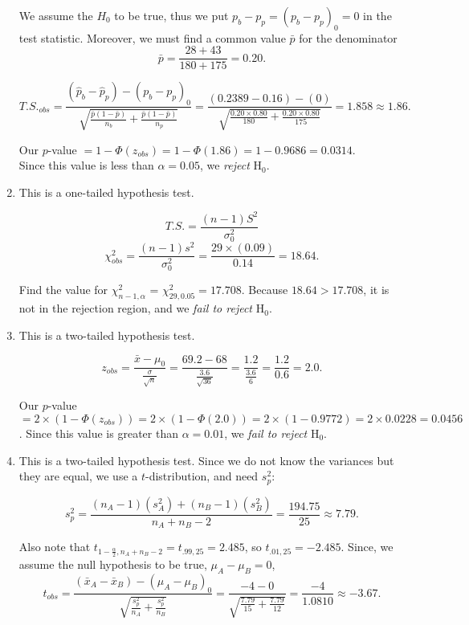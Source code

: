 \begin{enumerate}[Q 1.]
We assume the $H_0$ to be true, thus we put $p_b - p_p=(p_b - p_p)_0=0$ in the test statistic.
Moreover, we must find a common value $\bar{p}$ for the denominator
$$\bar{p} = \frac{28+43}{180+175} = 0.20. $$

$$T.S._{obs} = \frac{(\hat{p}_b-\hat{p}_p)-(p_b - p_p)_0}{\sqrt{\frac{\bar{p}  (1 - \bar{p})}{n_b}+\frac{\bar{p}  (1 - \bar{p})}{n_p}}} = \frac{(0.2389-0.16)-(0)}{\sqrt{\frac{0.20 \times 0.80}{180} +\frac{0.20 \times 0.80}{175}}} = 1.858 \approx 1.86.$$

Our $p$-value $= 1 - \Phi(z_{obs}) = 1 - \Phi(1.86) = 1 - 0.9686 = 0.0314$. \\Since this value is less than $\alpha = 0.05$, we \emph{reject} H$_0$.\\
\item
\sol This is a one-tailed hypothesis test.

$$ T.S. = \frac{(n-1) S^2}{\sigma^2_0}$$
$$\chi_{obs}^2= \frac{(n-1)  s^2}{\sigma^2_0} = \frac{29 \times (0.09)}{0.14} = 18.64.$$

Find the value for $\chi_{n-1,\alpha}^2$ = $\chi_{29, 0.05}^2 = 17.708.$
Because $18.64 > 17.708$, it is not in the rejection region, and we \emph{fail to reject} H$_0$.
\item
	
\sol This is a two-tailed hypothesis test.

$$z_{obs} = \frac{\bar{x}-\mu_0}{\frac{\sigma}{\sqrt{n}}} = \frac{69.2 - 68}{\frac{3.6}{\sqrt{36}}} = \frac{1.2}{\frac{3.6}{6}} = \frac{1.2}{0.6} = 2.0.$$

Our $p$-value $= 2 \times (1 - \Phi(z_{obs})) = 2 \times (1 - \Phi(2.0)) = 2 \times (1 - 0.9772) = 2 \times 0.0228 = 0.0456$. Since this value is greater than $\alpha = 0.01$, we \emph{fail to reject} H$_0$.
\item 
	
\sol This is a two-tailed hypothesis test. Since we do not know the variances but they are equal, we use a $t$-distribution, and need $s_p^2$:

$$ s_p^2 = \frac{(n_A - 1)(s_A^2)+ (n_B -1)(s_B^2)}{n_A+n_B-2} = \frac{194.75}{25} \approx 7.79.$$

Also note that $t_{1-\frac{\alpha}{2},n_A+n_B-2} = t_{.99,25} = 2.485$, so $t_{.01,25} = -2.485$. 
Since, we assume the null hypothesis to be true, $\mu_A - \mu_B=0$,  
$$t_{obs} = \frac{(\bar{x}_A-\bar{x}_B)-(\mu_A - \mu_B)_0}{\sqrt{\frac{s_p^2}{n_A}+\frac{s_p^2}{n_B}}} = \frac{-4 - 0}{\sqrt{\frac{7.79}{15}+\frac{7.79}{12}}} = \frac{-4}{1.0810} \approx -3.67.$$


\end{enumerate}
